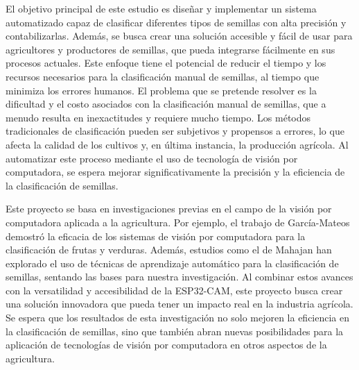 El objetivo principal de este estudio es diseñar y implementar un sistema automatizado capaz de clasificar diferentes tipos de semillas con alta precisión y contabilizarlas. Además, se busca crear una solución accesible y fácil de usar para agricultores y productores de semillas, que pueda integrarse fácilmente en sus procesos actuales. Este enfoque tiene el potencial de reducir el tiempo y los recursos necesarios para la clasificación manual de semillas, al tiempo que minimiza los errores humanos.
El problema que se pretende resolver es la dificultad y el costo asociados con la clasificación manual de semillas, que a menudo resulta en inexactitudes y requiere mucho tiempo. Los métodos tradicionales de clasificación pueden ser subjetivos y propensos a errores, lo que afecta la calidad de los cultivos y, en última instancia, la producción agrícola. Al automatizar este proceso mediante el uso de tecnología de visión por computadora, se espera mejorar significativamente la precisión y la eficiencia de la clasificación de semillas.


Este proyecto se basa en investigaciones previas en el campo de la visión por computadora aplicada a la agricultura. Por ejemplo, el trabajo de García-Mateos \cite{garcia2015study} demostró la eficacia de los sistemas de visión por computadora para la clasificación de frutas y verduras. Además, estudios como el de Mahajan \cite{mahajan2015image} han explorado el uso de técnicas de aprendizaje automático para la clasificación de semillas, sentando las bases para nuestra investigación.
Al combinar estos avances con la versatilidad y accesibilidad de la ESP32-CAM, este proyecto busca crear una solución innovadora que pueda tener un impacto real en la industria agrícola. Se espera que los resultados de esta investigación no solo mejoren la eficiencia en la clasificación de semillas, sino que también abran nuevas posibilidades para la aplicación de tecnologías de visión por computadora en otros aspectos de la agricultura.

